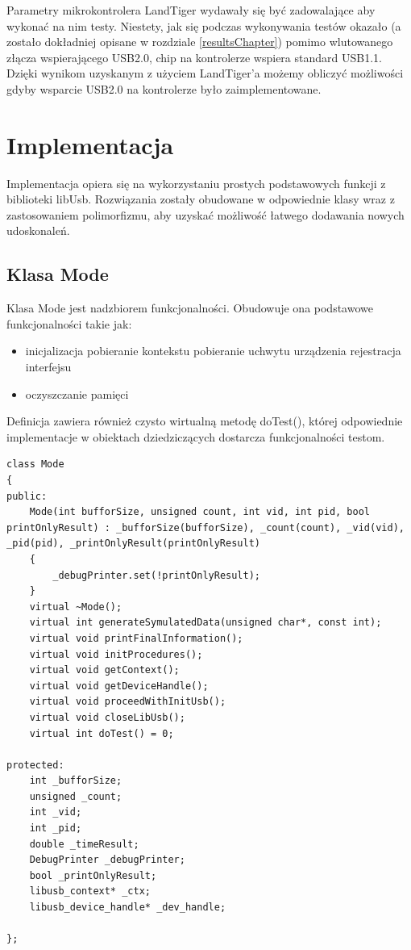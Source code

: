 \documentclass{BscUS}
\newcommand\blankpage{%
    \null
    \thispagestyle{empty}%
    \newpage}
\begin{document}
Parametry mikrokontrolera LandTiger wydawały się być zadowalające aby wykonać na nim testy. Niestety, jak się podczas wykonywania testów okazało (a zostało dokładniej opisane w rozdziale \ref{resultsChapter}) pomimo wlutowanego złącza wspierającego USB2.0, chip na kontrolerze wspiera standard USB1.1. Dzięki wynikom uzyskanym z użyciem LandTiger'a możemy obliczyć możliwości gdyby wsparcie USB2.0 na kontrolerze było zaimplementowane.
\afterpage{\blankpage}

\chapter{Implementacja}
\label{implementationChapter}
Implementacja opiera się na wykorzystaniu prostych podstawowych funkcji z biblioteki libUsb. Rozwiązania zostały obudowane w odpowiednie klasy wraz z zastosowaniem polimorfizmu, aby uzyskać możliwość łatwego dodawania nowych udoskonaleń.

\section{Klasa Mode}
Klasa Mode jest nadzbiorem funkcjonalności. Obudowuje ona podstawowe funkcjonalności takie jak:
\begin{itemize}
\item inicjalizacja
\subitem pobieranie kontekstu
\subitem pobieranie uchwytu urządzenia
\subitem rejestracja interfejsu
\item oczyszczanie pamięci
\end{itemize}
Definicja zawiera również czysto wirtualną metodę doTest(), której odpowiednie implementacje w obiektach dziedziczących dostarcza funkcjonalności testom.
\begin{lstlisting}[caption={Deklaracja klasy Mode},label={lst:CMode}]
class Mode
{
public:
	Mode(int bufforSize, unsigned count, int vid, int pid, bool printOnlyResult) : _bufforSize(bufforSize), _count(count), _vid(vid), _pid(pid), _printOnlyResult(printOnlyResult)
	{
		_debugPrinter.set(!printOnlyResult);
	}
	virtual ~Mode();
	virtual int generateSymulatedData(unsigned char*, const int);
	virtual void printFinalInformation();
	virtual void initProcedures();
	virtual void getContext();
	virtual void getDeviceHandle();
	virtual void proceedWithInitUsb();
	virtual void closeLibUsb();
	virtual int doTest() = 0;
	
protected:
	int _bufforSize;
	unsigned _count;
	int _vid;
	int _pid;
	double _timeResult;
	DebugPrinter _debugPrinter;
	bool _printOnlyResult;
	libusb_context* _ctx;
	libusb_device_handle* _dev_handle;

};
\end{lstlisting}
\end{document}
